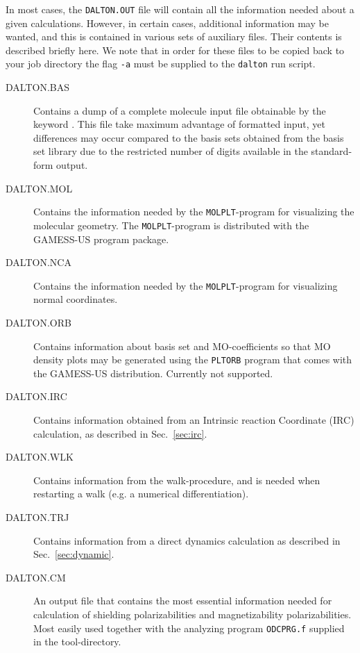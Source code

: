 In most cases, the \verb|DALTON.OUT| file will contain all the
information needed about a given calculations. However, in certain
cases, additional information may be wanted, and this is contained
in various sets of auxiliary files. Their contents is described
briefly here. We note that in order for these files to be copied
back to your job directory the flag \verb|-a| must be supplied to
the \verb|dalton| run script.

\begin{description}
\item[DALTON.BAS] Contains a dump of a complete molecule input file
obtainable by the keyword . This file take maximum
advantage of formatted input, yet differences may occur compared to
the basis sets obtained from the basis set library due to the
restricted number of digits available in the standard-form output.

\item[DALTON.MOL] Contains the information needed by the
\verb|MOLPLT|-program for visualizing the molecular geometry. The
\verb|MOLPLT|-program is distributed with the GAMESS-US program
package.

\item[DALTON.NCA] Contains the information needed by the
\verb|MOLPLT|-program for visualizing normal coordinates.

\item[DALTON.ORB] Contains information about basis set and
MO-coefficients so that MO density plots may be generated using the
\verb|PLTORB| program that comes with the GAMESS-US
distribution. Currently not supported.

\item[DALTON.IRC] Contains information obtained from an Intrinsic
reaction Coordinate (IRC) calculation, as described in
Sec.~\ref{sec:irc}.

\item[DALTON.WLK] Contains information from the walk-procedure, and is
needed when restarting a walk (e.g. a numerical differentiation).

\item[DALTON.TRJ] Contains information from a direct dynamics
calculation as described in Sec.~\ref{sec:dynamic}.

\item[DALTON.CM] An output file that contains the most essential
information needed for calculation of shielding polarizabilities
and magnetizability polarizabilities. Most easily used together
with the analyzing program \verb|ODCPRG.f| supplied in the
tool-directory.


\end{description}
